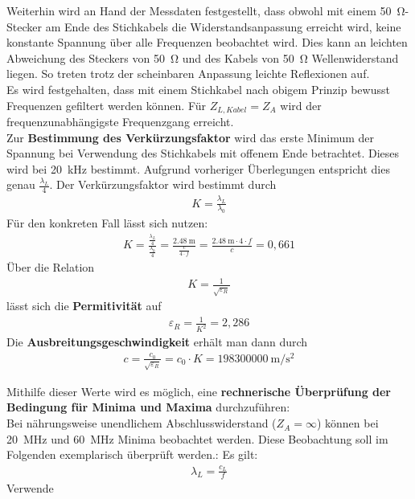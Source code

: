 \documentclass[a4paper,twoside,final]{article}
\begin{document}
Weiterhin wird an Hand der Messdaten festgestellt, dass obwohl mit einem \SI{50}{\ohm}-Stecker am Ende des Stichkabels die Widerstandsanpassung erreicht wird, keine konstante Spannung über alle Frequenzen beobachtet wird. Dies kann an leichten Abweichung des Steckers von \SI{50}{\ohm} und des Kabels von \SI{50}{\ohm} Wellenwiderstand liegen. So treten trotz der scheinbaren Anpassung leichte Reflexionen auf. \\
Es wird festgehalten, dass mit einem Stichkabel nach obigem Prinzip bewusst Frequenzen gefiltert werden können. Für $Z_{L, Kabel} = Z_A$ wird der frequenzunabhängigste Frequenzgang erreicht.\\

Zur \textbf{Bestimmung des Verkürzungsfaktor} wird das erste Minimum der Spannung bei Verwendung des Stichkabels mit offenem Ende betrachtet. Dieses wird bei \SI{20}{\kilo\hertz} bestimmt. Aufgrund vorheriger Überlegungen entspricht dies genau $\frac{\lambda_{L}}{4}$. Der Verkürzungsfaktor wird bestimmt durch
\begin{align}
K = \frac{\lambda_{L}}{\lambda_0}
\end{align}
Für den konkreten Fall lässt sich nutzen:
\begin{align}\label{equ:K}
K = \frac{\frac{\lambda_L}{4}}{\frac{\lambda_0}{4}} = \frac{\SI{2,48}{\meter}}{\frac{c}{4\cdot f}} = \frac{\SI{2,48}{\meter}\cdot 4 \cdot f}{c} = 0,661
\end{align}
Über die Relation
\begin{align}
K = \frac{1}{\sqrt{\varepsilon_R}}
\end{align}
lässt sich die \textbf{Permitivität} auf
\begin{align}
\varepsilon_R = \frac{1}{K^2} = 2,286
\end{align}
Die \textbf{Ausbreitungsgeschwindigkeit} erhält man dann durch
\begin{align}
c = \frac{c_0}{\sqrt{\varepsilon_R}} = c_0 \cdot K = \SI{198300000}{\meter\per\second\squared}
\end{align}

 Mithilfe dieser Werte wird es möglich, eine \textbf{rechnerische Überprüfung der Bedingung für Minima und Maxima} durchzuführen:\\
 Bei nährungsweise unendlichem Abschlusswiderstand ($Z_A = \infty$) können bei
 \SI{20}{\mega\hertz} und \SI{60}{\mega\hertz} Minima beobachtet werden. Diese Beobachtung soll im Folgenden exemplarisch überprüft werden.:
 Es gilt:
 \begin{align}
   \lambda_{L}  = \frac{c_{L}}{f}
 \end{align}
 Verwende
\end{document}
